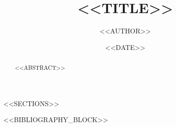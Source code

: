 \documentclass[12pt, a4paper]{article}
\title{<<TITLE>>}
\author{<<AUTHOR>>}
\date{<<DATE>>}
\begin{document}
\maketitle

\begin{abstract}
<<ABSTRACT>>
\end{abstract}

<<SECTIONS>>

<<BIBLIOGRAPHY_BLOCK>>
\end{document}
